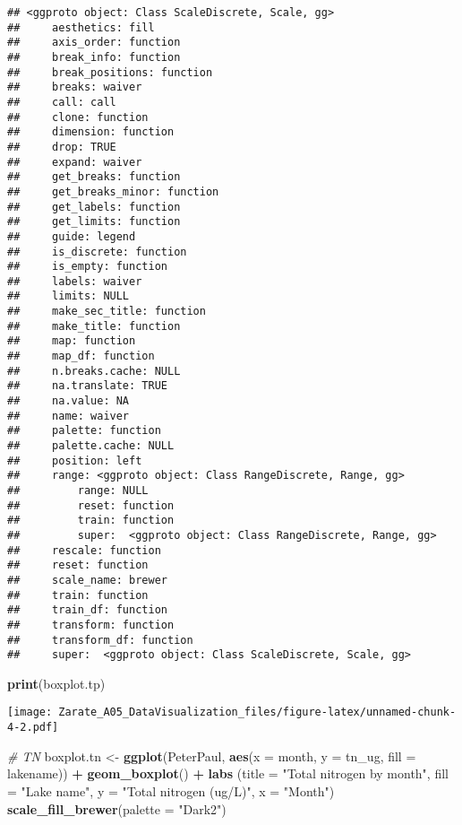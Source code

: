 \documentclass[
]{article}
\newenvironment{Shaded}{\begin{snugshade}}{\end{snugshade}}
\newcommand{\CommentTok}[1]{\textcolor[rgb]{0.56,0.35,0.01}{\textit{#1}}}
\newcommand{\DataTypeTok}[1]{\textcolor[rgb]{0.13,0.29,0.53}{#1}}
\newcommand{\KeywordTok}[1]{\textcolor[rgb]{0.13,0.29,0.53}{\textbf{#1}}}
\newcommand{\NormalTok}[1]{#1}
\newcommand{\OperatorTok}[1]{\textcolor[rgb]{0.81,0.36,0.00}{\textbf{#1}}}
\newcommand{\StringTok}[1]{\textcolor[rgb]{0.31,0.60,0.02}{#1}}
\begin{document}
\begin{verbatim}
## <ggproto object: Class ScaleDiscrete, Scale, gg>
##     aesthetics: fill
##     axis_order: function
##     break_info: function
##     break_positions: function
##     breaks: waiver
##     call: call
##     clone: function
##     dimension: function
##     drop: TRUE
##     expand: waiver
##     get_breaks: function
##     get_breaks_minor: function
##     get_labels: function
##     get_limits: function
##     guide: legend
##     is_discrete: function
##     is_empty: function
##     labels: waiver
##     limits: NULL
##     make_sec_title: function
##     make_title: function
##     map: function
##     map_df: function
##     n.breaks.cache: NULL
##     na.translate: TRUE
##     na.value: NA
##     name: waiver
##     palette: function
##     palette.cache: NULL
##     position: left
##     range: <ggproto object: Class RangeDiscrete, Range, gg>
##         range: NULL
##         reset: function
##         train: function
##         super:  <ggproto object: Class RangeDiscrete, Range, gg>
##     rescale: function
##     reset: function
##     scale_name: brewer
##     train: function
##     train_df: function
##     transform: function
##     transform_df: function
##     super:  <ggproto object: Class ScaleDiscrete, Scale, gg>
\end{verbatim}

\begin{Shaded}
\begin{Highlighting}[]
\KeywordTok{print}\NormalTok{(boxplot.tp)}
\end{Highlighting}
\end{Shaded}

\texttt{[image: Zarate\_A05\_DataVisualization\_files/figure-latex/unnamed-chunk-4-2.pdf]}

\begin{Shaded}
\begin{Highlighting}[]
\CommentTok{# TN}
\NormalTok{boxplot.tn <-}\StringTok{ }\KeywordTok{ggplot}\NormalTok{(PeterPaul, }\KeywordTok{aes}\NormalTok{(}\DataTypeTok{x =}\NormalTok{ month, }\DataTypeTok{y =}\NormalTok{ tn_ug, }\DataTypeTok{fill =}\NormalTok{ lakename)) }\OperatorTok{+}
\StringTok{  }\KeywordTok{geom_boxplot}\NormalTok{() }\OperatorTok{+}
\StringTok{  }\KeywordTok{labs}\NormalTok{ (}\DataTypeTok{title =} \StringTok{"Total nitrogen by month"}\NormalTok{, }\DataTypeTok{fill =} \StringTok{"Lake name"}\NormalTok{,}
        \DataTypeTok{y =} \StringTok{"Total nitrogen (ug/L)"}\NormalTok{, }\DataTypeTok{x =} \StringTok{"Month"}\NormalTok{) }
  \KeywordTok{scale_fill_brewer}\NormalTok{(}\DataTypeTok{palette =} \StringTok{"Dark2"}\NormalTok{)}
\end{Highlighting}
\end{Shaded}
\end{document}
